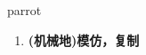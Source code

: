 
\begin{frame}
{\huge parrot}
\begin{center}
\begin{enumerate}\Large
  \item \textbf{(机械地)模仿，复制}
\end{enumerate}
\end{center}
\end{frame}
